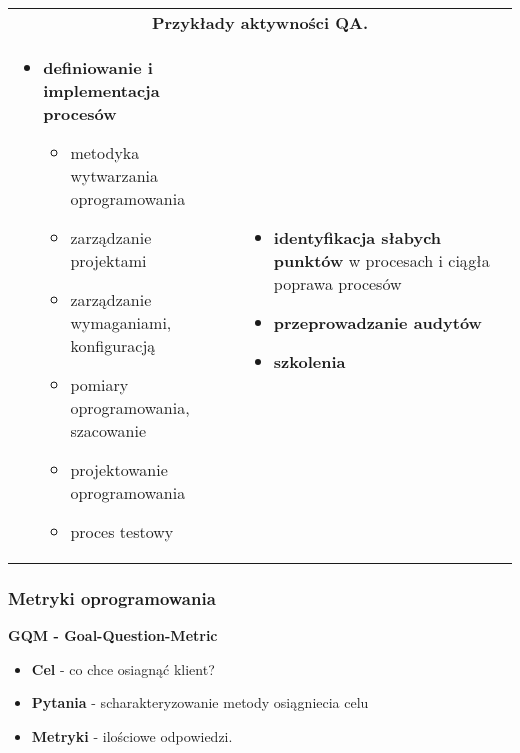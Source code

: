 \documentclass[../main.tex]{subfiles}
\begin{document}
    \begin{table}[H]
        \begin{center}
            \begin{tabular}{p{8cm} p{8cm}}
                \multicolumn{2}{c}{\textbf{Przykłady aktywności QA.}} \\
                \begin{itemize}
                    \item \textbf{definiowanie i implementacja procesów}
                    \begin{itemize}
                        \item metodyka wytwarzania oprogramowania
                        \item zarządzanie projektami
                        \item zarządzanie wymaganiami, konfiguracją
                        \item pomiary oprogramowania, szacowanie
                        \item projektowanie oprogramowania
                        \item proces testowy
                    \end{itemize}
                \end{itemize}
                &
                \begin{itemize}
                    \item \textbf{identyfikacja słabych punktów} w procesach i ciągła poprawa procesów
                    \item \textbf{przeprowadzanie audytów}
                    \item \textbf{szkolenia}
                \end{itemize}
            \end{tabular}
        \end{center}
    \end{table}

    \subsubsection{Metryki oprogramowania}

    \textbf{GQM - Goal-Question-Metric}
    \begin{itemize}
        \item \textbf{Cel} - co chce osiagnąć klient?
        \item \textbf{Pytania} - scharakteryzowanie metody osiągniecia celu
        \item \textbf{Metryki} - ilościowe odpowiedzi.
    \end{itemize}
\end{document}
